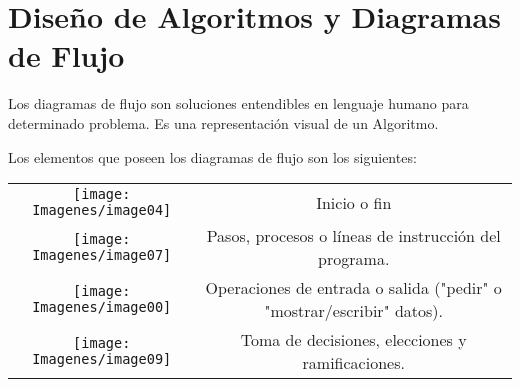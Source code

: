 \section*{Diseño de Algoritmos y Diagramas de Flujo}

Los diagramas de flujo son soluciones entendibles en lenguaje humano para determinado problema. Es una representación visual de un Algoritmo.

Los elementos que poseen los diagramas de flujo son los siguientes:
\begin{center}
    \begin{tabular}{ c c  }
        \texttt{[image: Imagenes/image04]} & 
        Inicio o fin  \\ 
        \texttt{[image: Imagenes/image07]} & Pasos, procesos o líneas de instrucción del programa.  \\  
        \texttt{[image: Imagenes/image00]} & Operaciones de entrada o salida ("pedir" o "mostrar/escribir" datos).  \\  
        \texttt{[image: Imagenes/image09]} & Toma de decisiones, elecciones y ramificaciones.
    \end{tabular}
\end{center}


